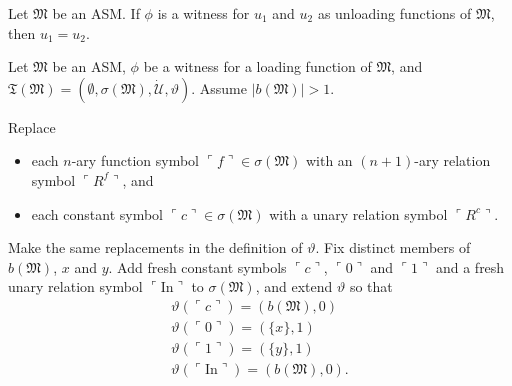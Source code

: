 \documentclass[12pt]{article}
\numberwithin{equation}{section}
\begin{document}
\begin{fact}\label{fact216}
Let $\mathfrak{M}$ be an ASM. If $\phi$ is a witness for $u_1$ and $u_2$ as unloading functions of $\mathfrak{M}$, then $u_1 = u_2$.
\end{fact}

Let $\mathfrak{M}$ be an ASM, $\phi$ be a witness for a loading function of $\mathfrak{M}$, and $\mathfrak{T}(\mathfrak{M}) = (\emptyset, \sigma(\mathfrak{M}), \dot{\mathcal{U}}, \vartheta)$. Assume $|b(\mathfrak{M})| > 1$. 

Replace
\begin{itemize}
    \item each $n$-ary function symbol $\ulcorner f \urcorner \in \sigma(\mathfrak{M})$ with an $(n+1)$-ary relation symbol $\ulcorner R^f \urcorner$, and
    \item each constant symbol $\ulcorner c \urcorner \in \sigma(\mathfrak{M})$ with a unary relation symbol $\ulcorner R^c \urcorner$.
\end{itemize}
Make the same replacements in the definition of $\vartheta$. Fix distinct members of $b(\mathfrak{M})$, $x$ and $y$. Add fresh constant symbols $\ulcorner c \urcorner$, $\ulcorner 0 \urcorner$ and $\ulcorner 1 \urcorner$ and a fresh unary relation symbol $\ulcorner \mathrm{In} \urcorner$ to $\sigma(\mathfrak{M})$, and extend $\vartheta$ so that
\begin{gather*}
    \vartheta(\ulcorner c \urcorner) = (b(\mathfrak{M}), 0) \\
    \vartheta(\ulcorner 0 \urcorner) = (\{x\}, 1) \\
    \vartheta(\ulcorner 1 \urcorner) = (\{y\}, 1) \\
    \vartheta(\ulcorner \mathrm{In} \urcorner) = (b(\mathfrak{M}), 0) \text{.}
\end{gather*}
\end{document}
